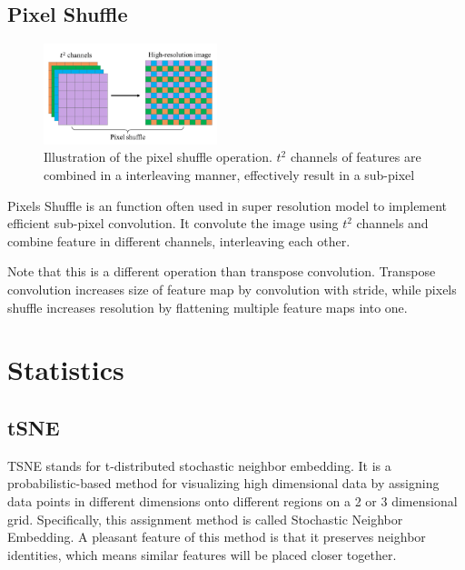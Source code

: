 \section{Pixel Shuffle}
\label{app:ml:pix_shuf}

\begin{figure}
    \centering
    \includegraphics[width=0.45\textwidth]{images/appendix/pixel_shuffle.png}
    \caption{Illustration of the pixel shuffle operation. $t^2$ channels of features are combined in a interleaving manner, effectively result in a sub-pixel}
    \label{fig:pixel_shuffle}
\end{figure}

Pixels Shuffle is an function often used in super resolution model to implement efficient sub-pixel convolution. It convolute the image using $t^2$ channels and combine feature in different channels, interleaving each other. 

Note that this is a different operation than transpose convolution. Transpose convolution increases size of feature map by convolution with stride, while pixels shuffle increases resolution by flattening multiple feature maps into one. 



\chapter{Statistics}
\label{app:stat}

\section{tSNE}
\label{app:stat:tsne}
TSNE stands for t-distributed stochastic neighbor embedding. It is a probabilistic-based method for visualizing high dimensional data by assigning data points in different dimensions onto different regions on a 2 or 3 dimensional grid. Specifically, this assignment method is called Stochastic Neighbor Embedding\cite{hintonStochasticNeighborEmbedding2002}. A pleasant feature of this method is that it preserves neighbor identities, which means similar features will be placed closer together.

